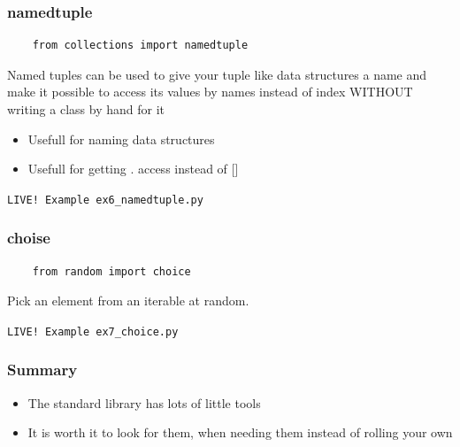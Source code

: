 \documentclass{beamer}
\begin{document}
\begin{frame}[fragile]
  \frametitle{namedtuple}
  \begin{verbatim}
    from collections import namedtuple
  \end{verbatim}
  \begin{block}{\vspace*{-3ex}}
    Named tuples can be used to give your tuple like data structures a
    name and make it possible to access its values by names instead of
    index WITHOUT writing a class by hand for it
  \end{block}
  \begin{itemize}
  \item Usefull for naming data structures
  \item Usefull for getting . access instead of []
  \end{itemize}
  \begin{center}
    \texttt{LIVE! Example ex6\_namedtuple.py}
  \end{center}
\end{frame}

\begin{frame}[fragile]
  \frametitle{choise}
  \begin{verbatim}
    from random import choice
  \end{verbatim}
  \begin{block}{\vspace*{-3ex}}
    Pick an element from an iterable at random.
  \end{block}
  \begin{center}
    \texttt{LIVE! Example ex7\_choice.py}
  \end{center}
\end{frame}

\begin{frame}
  \frametitle{Summary}
  \begin{itemize}
  \item The standard library has lots of little tools
  \item It is worth it to look for them, when needing them instead of
    rolling your own
  \end{itemize}
\end{frame}

\end{document}
